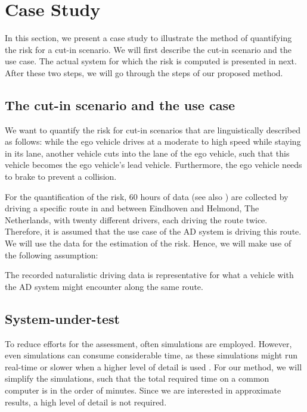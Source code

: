 \section{Case Study} %

In this section, we present a case study to illustrate the method of quantifying the risk for a cut-in scenario. We will first describe the cut-in scenario and the use case. The actual system for which the risk is computed is presented in next. After these two steps, we will go through the steps of our proposed method.



\subsection{The cut-in scenario and the use case}

We want to quantify the risk for cut-in scenarios that are linguistically described as follows: while the ego vehicle drives at a moderate to high speed while staying in its lane, another vehicle cuts into the lane of the ego vehicle, such that this vehicle becomes the ego vehicle's lead vehicle. Furthermore, the ego vehicle needs to brake to prevent a collision.

For the quantification of the risk, 60 hours of data (see also \cite{deGelder2017assessment}) are collected by driving a specific route in and between Eindhoven and Helmond, The Netherlands, with twenty different drivers, each driving the route twice. Therefore, it is assumed that the use case of the AD system is driving this route. We will use the data for the estimation of the risk. Hence, we will make use of the following assumption:
\begin{assumption}
	The recorded naturalistic driving data is representative for what a vehicle with the AD system might encounter along the same route.
\end{assumption}



\subsection{System-under-test}

To reduce efforts for the assessment, often simulations are employed. However, even simulations can consume considerable time, as these simulations might run real-time \cite{shah2018airsim} or slower when a higher level of detail is used \cite{zofka2016testing}. For our method, we will simplify the simulations, such that the total required time on a common computer is in the order of minutes. Since we are interested in approximate results, a high level of detail is not required. 

